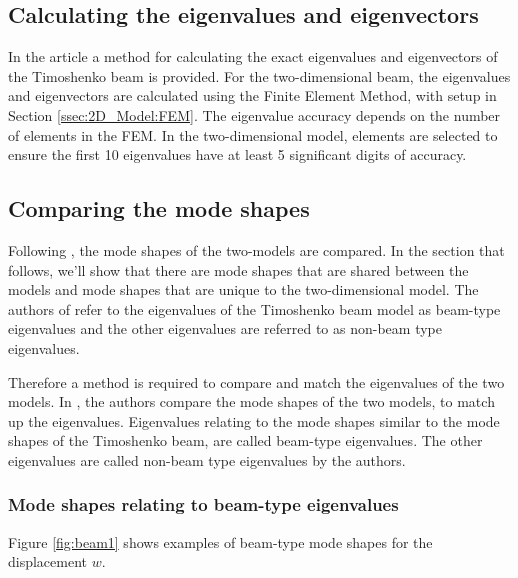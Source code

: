 	\subsection*{Calculating the eigenvalues and eigenvectors}
	In the article \cite{VV02} a method for calculating the exact eigenvalues and eigenvectors of the Timoshenko beam is provided. For the two-dimensional beam, the eigenvalues and eigenvectors are calculated using the Finite Element Method, with setup in Section \ref{ssec:2D_Model:FEM}. The eigenvalue accuracy depends on the number of elements in the FEM. In the two-dimensional model, elements are selected to ensure the first 10 eigenvalues have at least 5 significant digits of accuracy.

	\subsection*{Comparing the mode shapes}
	Following \cite{LVV09}, the mode shapes of the two-models are compared. In the section that follows, we'll show that there are mode shapes that are shared between the models and mode shapes that are unique to the two-dimensional model. The authors of \cite{LVV09} refer to the eigenvalues of the Timoshenko beam model as beam-type eigenvalues and the other eigenvalues are referred to as non-beam type eigenvalues.

	Therefore a method is required to compare and match the eigenvalues of the two models. In \cite{LVV09}, the authors compare the mode shapes of the two models, to match up the eigenvalues. Eigenvalues relating to the mode shapes similar to the mode shapes of the Timoshenko beam, are called beam-type eigenvalues. The other eigenvalues are called non-beam type eigenvalues by the authors.


	\subsubsection*{Mode shapes relating to beam-type eigenvalues}

	Figure \ref{fig:beam1} shows examples of beam-type mode shapes for the displacement $w$.


